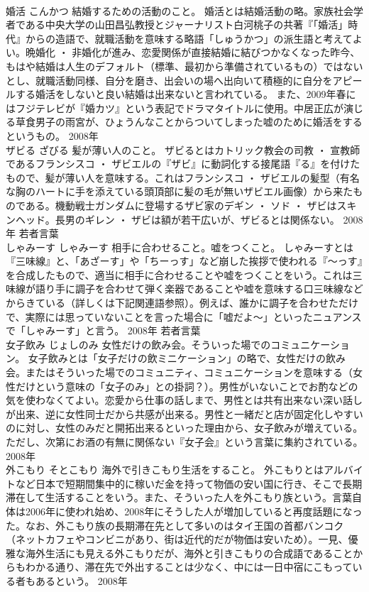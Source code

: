 \documentclass[8pt]{extreport}
\begin{document}
\begin{CJK}{UTF8}{min}
\\	婚活	こんかつ	結婚するための活動のこと。	婚活とは結婚活動の略。家族社会学者である中央大学の山田昌弘教授とジャーナリスト白河桃子の共著『「婚活」時代』からの造語で、就職活動を意味する略語「しゅうかつ」の派生語と考えてよい。晩婚化 ・ 非婚化が進み、恋愛関係が直接結婚に結びつかなくなった昨今、もはや結婚は人生のデフォルト（標準、最初から準備されているもの）ではないとし、就職活動同様、自分を磨き、出会いの場へ出向いて積極的に自分をアピールする婚活をしないと良い結婚は出来ないと言われている。 また、2009年春にはフジテレビが『婚カツ』という表記でドラマタイトルに使用。中居正広が演じる草食男子の雨宮が、ひょうんなことからついてしまった嘘のために婚活をするというもの。	2008年	
\\	ザビる	ざびる	髪が薄い人のこと。	ザビるとはカトリック教会の司教 ・ 宣教師であるフランシスコ ・ ザビエルの『ザビ』に動詞化する接尾語『る』を付けたもので、髪が薄い人を意味する。これはフランシスコ ・ ザビエルの髪型（有名な胸のハートに手を添えている頭頂部に髪の毛が無いザビエル画像）から来たものである。機動戦士ガンダムに登場するザビ家のデギン ・ ソド ・ ザビはスキンヘッド。長男のギレン ・ ザビは額が若干広いが、ザビるとは関係ない。	2008年	若者言葉	
\\	しゃみーす	しゃみーす	相手に合わせること。嘘をつくこと。	しゃみーすとは『三味線』と、「あざーす」や「ちーっす」など崩した挨拶で使われる『～っす』を合成したもので、適当に相手に合わせることや嘘をつくことをいう。これは三味線が語り手に調子を合わせて弾く楽器であることや嘘を意味する口三味線などからきている（詳しくは下記関連語参照）。例えば、誰かに調子を合わせただけで、実際には思っていないことを言った場合に「嘘だよ～」といったニュアンスで「しゃみーす」と言う。	2008年	若者言葉	
\\	女子飲み	じょしのみ	女性だけの飲み会。そういった場でのコミュニケーション。	女子飲みとは「女子だけの飲ミニケーション」の略で、女性だけの飲み会。またはそういった場でのコミュニティ、コミュニケーションを意味する（女性だけという意味の「女子のみ」との掛詞？）。男性がいないことでお酌などの気を使わなくてよい。恋愛から仕事の話しまで、男性とは共有出来ない深い話しが出来、逆に女性同士だから共感が出来る。男性と一緒だと店が固定化しやすいのに対し、女性のみだと開拓出来るといった理由から、女子飲みが増えている。 ただし、次第にお酒の有無に関係ない『女子会』という言葉に集約されている。	2008年	
\\	外こもり	そとこもり	海外で引きこもり生活をすること。	外こもりとはアルバイトなど日本で短期間集中的に稼いだ金を持って物価の安い国に行き、そこで長期滞在して生活することをいう。また、そういった人を外こもり族という。言葉自体は2006年に使われ始め、2008年にそうした人が増加していると再度話題になった。なお、外こもり族の長期滞在先として多いのはタイ王国の首都バンコク（ネットカフェやコンビニがあり、街は近代的だが物価は安いため）。一見、優雅な海外生活にも見える外こもりだが、海外と引きこもりの合成語であることからもわかる通り、滞在先で外出することは少なく、中には一日中宿にこもっている者もあるという。	2008年	

\end{CJK}
\end{document}
